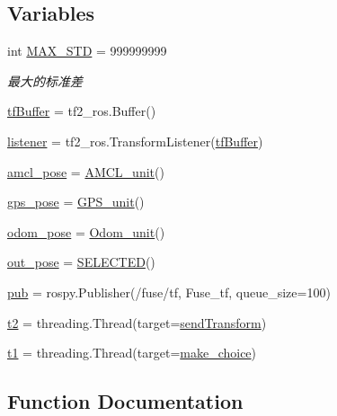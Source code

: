 \subsection*{Variables}
\begin{DoxyCompactItemize}
\item 
int \hyperlink{namespacefuse___g___a_aaf941e74ed538c700295aac63ee67285}{M\+A\+X\+\_\+\+S\+TD} = 999999999
\begin{DoxyCompactList}\small\item\em 最大的标准差 \end{DoxyCompactList}\item 
\hyperlink{namespacefuse___g___a_a11d49507fb155a9ee2f990026fd61296}{tf\+Buffer} = tf2\+\_\+ros.\+Buffer()
\item 
\hyperlink{namespacefuse___g___a_afbe833a768eabf8b7b5ff6c185358368}{listener} = tf2\+\_\+ros.\+Transform\+Listener(\hyperlink{namespacefuse___g___a_a11d49507fb155a9ee2f990026fd61296}{tf\+Buffer})
\item 
\hyperlink{namespacefuse___g___a_ad44ef455cd859abf54b7fb820ac11fba}{amcl\+\_\+pose} = \hyperlink{classfuse___g___a_1_1_a_m_c_l__unit}{A\+M\+C\+L\+\_\+unit}()
\item 
\hyperlink{namespacefuse___g___a_a1d4e9854825529f046953591e1b9766f}{gps\+\_\+pose} = \hyperlink{classfuse___g___a_1_1_g_p_s__unit}{G\+P\+S\+\_\+unit}()
\item 
\hyperlink{namespacefuse___g___a_a6db926371ea8e7616cf9da51a44f20bd}{odom\+\_\+pose} = \hyperlink{classfuse___g___a_1_1_odom__unit}{Odom\+\_\+unit}()
\item 
\hyperlink{namespacefuse___g___a_a5949d6caccbce2dc58746d004a31bf93}{out\+\_\+pose} = \hyperlink{classfuse___g___a_1_1_s_e_l_e_c_t_e_d}{S\+E\+L\+E\+C\+T\+ED}()
\item 
\hyperlink{namespacefuse___g___a_a6fc70b260b3bf31db68f3261fcd332d1}{pub} = rospy.\+Publisher(\textquotesingle{}/fuse/tf\textquotesingle{}, Fuse\+\_\+tf, queue\+\_\+size=100)
\item 
\hyperlink{namespacefuse___g___a_a0687b548a1348e39b486842bcddc00ef}{t2} = threading.\+Thread(target=\hyperlink{namespacefuse___g___a_a6d74da897ef71d656b91058602147dd2}{send\+Transform})
\item 
\hyperlink{namespacefuse___g___a_aeffb45e80aff08f6f7194fcbc88eff08}{t1} = threading.\+Thread(target=\hyperlink{namespacefuse___g___a_a42c3d8256503837ca1b83810899b7ef1}{make\+\_\+choice})
\end{DoxyCompactItemize}


\subsection{Function Documentation}
\mbox{\label{namespacefuse___g___a_a42c3d8256503837ca1b83810899b7ef1}} 
